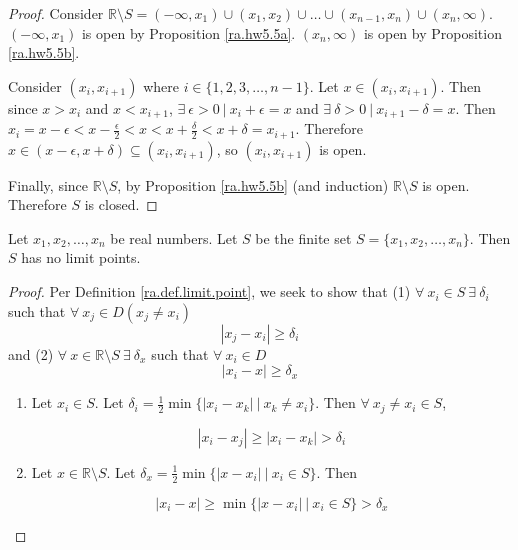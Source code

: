 \begin{proof} Consider \(\mathbb{R} \setminus S = (-\infty, x_1) \cup (x_1, x_2) \cup \ldots \cup (x_{n-1}, x_n) \cup (x_n, \infty)\). \((-\infty, x_1)\) is open by Proposition \ref{ra.hw5.5a}. \((x_n, \infty)\) is open by Proposition \ref{ra.hw5.5b}. 

Consider \((x_i, x_{i+1})\) where \(i \in \{1, 2, 3, \ldots, n-1\}\). Let \(x \in (x_i, x_{i+1})\). Then since \(x > x_i\) and \(x < x_{i+1}\), \(\exists \ \epsilon > 0 \ | \ x_i + \epsilon = x\) and \(\exists \ \delta > 0 \ | \ x_{i+1} - \delta = x\). Then \(x_i = x - \epsilon < x - \frac{\epsilon}{2} < x < x + \frac{\delta}{2} < x + \delta = x_{i+1}\). Therefore \(x \in (x - \epsilon, x + \delta) \subseteq (x_i, x_{i+1})\), so \((x_i, x_{i+1})\) is open.

Finally, since \(\mathbb{R} \setminus S\), by Proposition \ref{ra.hw5.5b} (and induction) \(\mathbb{R} \setminus S\) is open. Therefore \(S\) is closed.
\end{proof}

\begin{proposition}\label{ra.hw5.6b} Let \(x_1, x_2, \ldots, x_n\) be real numbers. Let \(S\) be the finite set \(S = \{x_1, x_2, \ldots, x_n\}\). Then \(S\) has no limit points.\end{proposition}

\begin{proof} 


Per Definition \ref{ra.def.limit.point}, we seek to show that (1) \(\forall \ x_i \in S \ \exists \ \delta_i\) such that \(\forall \ x_j \in D (x_j \neq x_i)\) \[|x_j - x_i| \geq \delta_i\] and (2) \(\forall \ x \in \mathbb{R} \setminus S \ \exists \ \delta_x\) such that \(\forall \ x_i \in D\) \[|x_i - x| \geq \delta_x\]

\begin{enumerate}[(1)]
\item Let \(x_i \in S\). Let \(\delta_i = \frac{1}{2}\min \{|x_i - x_k| \ | \ x_k \neq x_i \}\). Then \(\forall \ x_j \neq x_i \in S\), 

\[
|x_i - x_j| \geq |x_i - x_k| > \delta_i
\]

\item Let \(x \in \mathbb{R} \setminus S\). Let \(\delta_x = \frac{1}{2} \min \{|x - x_i| \ | \ x_i \in S \} \). Then

\[
|x_i - x| \geq  \min \{|x - x_i| \ | \ x_i \in S \} > \delta_x
\]

\end{enumerate}
\end{proof}

